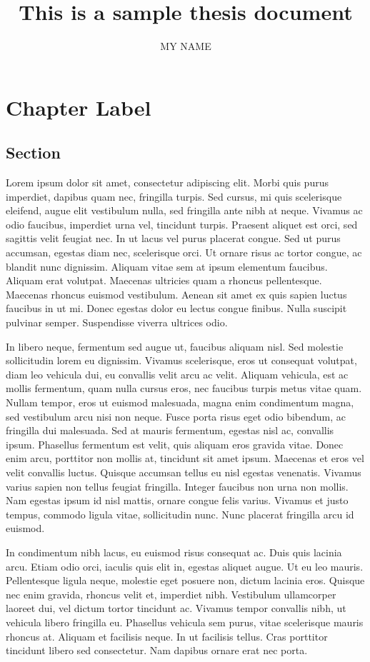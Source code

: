 \documentclass[draft]{yorkUThesisTemplate}
\title{This is a sample thesis document}
\author{MY NAME}
\begin{document}
\makefrontmatter
\formatmainmatter

\chapter{Chapter Label}
\section{Section}
Lorem ipsum dolor sit amet, consectetur adipiscing elit. Morbi quis purus imperdiet, dapibus quam nec, fringilla turpis. Sed cursus, mi quis scelerisque eleifend, augue elit vestibulum nulla, sed fringilla ante nibh at neque. Vivamus ac odio faucibus, imperdiet urna vel, tincidunt turpis. Praesent aliquet est orci, sed sagittis velit feugiat nec. In ut lacus vel purus placerat congue. Sed ut purus accumsan, egestas diam nec, scelerisque orci. Ut ornare risus ac tortor congue, ac blandit nunc dignissim. Aliquam vitae sem at ipsum elementum faucibus. Aliquam erat volutpat. Maecenas ultricies quam a rhoncus pellentesque. Maecenas rhoncus euismod vestibulum. Aenean sit amet ex quis sapien luctus faucibus in ut mi. Donec egestas dolor eu lectus congue finibus. Nulla suscipit pulvinar semper. Suspendisse viverra ultrices odio.

In libero neque, fermentum sed augue ut, faucibus aliquam nisl. Sed molestie sollicitudin lorem eu dignissim. Vivamus scelerisque, eros ut consequat volutpat, diam leo vehicula dui, eu convallis velit arcu ac velit. Aliquam vehicula, est ac mollis fermentum, quam nulla cursus eros, nec faucibus turpis metus vitae quam. Nullam tempor, eros ut euismod malesuada, magna enim condimentum magna, sed vestibulum arcu nisi non neque. Fusce porta risus eget odio bibendum, ac fringilla dui malesuada. Sed at mauris fermentum, egestas nisl ac, convallis ipsum. Phasellus fermentum est velit, quis aliquam eros gravida vitae. Donec enim arcu, porttitor non mollis at, tincidunt sit amet ipsum. Maecenas et eros vel velit convallis luctus. Quisque accumsan tellus eu nisl egestas venenatis. Vivamus varius sapien non tellus feugiat fringilla. Integer faucibus non urna non mollis. Nam egestas ipsum id nisl mattis, ornare congue felis varius. Vivamus et justo tempus, commodo ligula vitae, sollicitudin nunc. Nunc placerat fringilla arcu id euismod.

In condimentum nibh lacus, eu euismod risus consequat ac. Duis quis lacinia arcu. Etiam odio orci, iaculis quis elit in, egestas aliquet augue. Ut eu leo mauris. Pellentesque ligula neque, molestie eget posuere non, dictum lacinia eros. Quisque nec enim gravida, rhoncus velit et, imperdiet nibh. Vestibulum ullamcorper laoreet dui, vel dictum tortor tincidunt ac. Vivamus tempor convallis nibh, ut vehicula libero fringilla eu. Phasellus vehicula sem purus, vitae scelerisque mauris rhoncus at. Aliquam et facilisis neque. In ut facilisis tellus. Cras porttitor tincidunt libero sed consectetur. Nam dapibus ornare erat nec porta.
\end{document}
